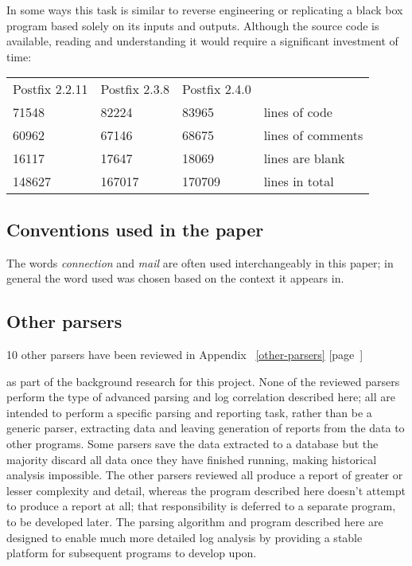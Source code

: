 \documentclass[a4paper,12pt,draft]{article}
\newcommand{\refwithpage}[1]{%
    \empty{}\ref{#1} [page~\pageref{#1}]%
}
\begin{document}
In some ways this task is similar to reverse engineering or replicating a
black box program based solely on its inputs and outputs.  Although the
source code is available, reading and understanding it would require a
significant investment of time:

\begin{tabular}[]{llll}

    Postfix 2.2.11  & Postfix 2.3.8   & Postfix 2.4.0 &                   \\
    71548           & 82224           & 83965         & lines of code     \\
    60962           & 67146           & 68675         & lines of comments \\
    16117           & 17647           & 18069         & lines are blank   \\
    148627          & 167017          & 170709        & lines in total    \\

\end{tabular}


\subsection{Conventions used in the paper}

The words \textit{connection\/} and \textit{mail\/} are often used
interchangeably in this paper; in general the word used was chosen based on
the context it appears in.

\subsection{Other parsers}

10 other parsers have been reviewed in Appendix~\refwithpage{other-parsers}
as part of the background research for this project.  None of the reviewed
parsers perform the type of advanced parsing and log correlation described
here; all are intended to perform a specific parsing and reporting task,
rather than be a generic parser, extracting data and leaving generation of
reports from the data to other programs.  Some parsers save the data
extracted to a database but the majority discard all data once they have
finished running, making historical analysis impossible.  The other parsers
reviewed all produce a report of greater or lesser complexity and detail,
whereas the program described here doesn't attempt to produce a report at
all; that responsibility is deferred to a separate program, to be developed
later.  The parsing algorithm and program described here are designed to
enable much more detailed log analysis by providing a stable platform for
subsequent programs to develop upon.
\end{document}
